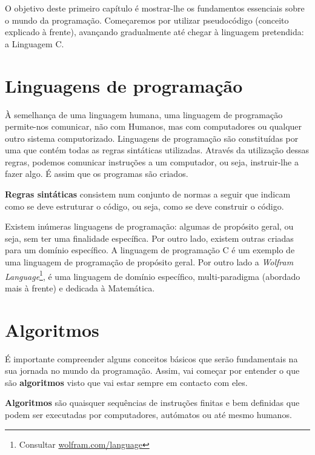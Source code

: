 O objetivo deste primeiro capítulo é mostrar-lhe os fundamentos essenciais sobre o mundo da programação. Começaremos por utilizar pseudocódigo (conceito explicado à frente), avançando gradualmente até chegar à linguagem pretendida: a Linguagem C.

\section{Linguagens de programação}

À semelhança de uma linguagem humana, uma linguagem de programação permite-nos comunicar, não com Humanos, mas com computadores ou qualquer outro sistema computorizado. Linguagens de programação são constituídas por uma  que contém todas as regras sintáticas utilizadas. Através da utilização dessas regras, podemos comunicar instruções a um computador, ou seja, instruir-lhe a fazer algo. É assim que os programas são criados.

\begin{defi}
\textbf{Regras sintáticas} consistem num conjunto de normas a seguir que indicam como se deve estruturar o código, ou seja, como se deve construir o código.
\end{defi}

Existem inúmeras linguagens de programação: algumas de propósito geral, ou seja, sem ter uma finalidade específica. Por outro lado, existem outras criadas para um domínio específico. A linguagem de programação C é um exemplo de uma linguagem de programação de propósito geral. Por outro lado a \textit{Wolfram Language}\footnote{Consultar \color{links}\href{http://www.wolfram.com/language/}{wolfram.com/language}}, é uma linguagem de domínio específico, multi-paradigma (abordado mais à frente) e dedicada à Matemática. 

\section{Algoritmos}

É importante compreender alguns conceitos básicos que serão fundamentais na sua jornada no mundo da programação. Assim, vai começar por entender o que são \textbf{algoritmos} visto que vai estar sempre em contacto com eles.

\begin{defi}
\textbf{Algoritmos} são quaisquer sequências de instruções finitas e bem definidas que podem ser executadas por computadores, autómatos ou até mesmo humanos.
\end{defi}

